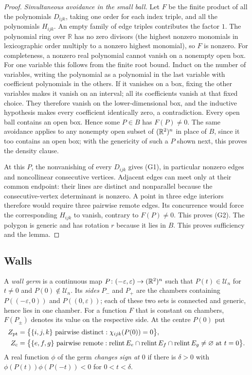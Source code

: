 \begin{proof}
\emph{Simultaneous avoidance in the small ball.}
Let $F$ be the finite product of all the polynomials $D_{ijk}$, taking
one order for each index triple, and all the polynomials $H_{ijk}$.
An empty family of edge triples contributes the factor $1$.
The polynomial ring over $\mathbb R$ has no zero divisors (the highest
nonzero monomials in lexicographic order multiply to a nonzero highest
monomial), so $F$ is nonzero.
For completeness, a nonzero real polynomial cannot vanish on a
nonempty open box. For one variable this follows from the finite root
bound. Induct on the number of variables, writing the polynomial as a
polynomial in the last variable with coefficient polynomials in the
others. If it vanishes on a box, fixing the other variables makes it
vanish on an interval; all its coefficients vanish at that fixed
choice. They therefore vanish on the lower-dimensional box, and the
inductive hypothesis makes every coefficient identically zero, a
contradiction. Every open ball contains an open box. Hence some
$P\in B$ has $F(P)\ne0$. The same avoidance applies to any nonempty open
subset of $(\mathbb R^2)^n$ in place of $B$, since it too contains an open box;
with the genericity of such a $P$ shown next, this proves the density clause.

At this $P$, the nonvanishing of every $D_{ijk}$ gives (G1), in
particular nonzero edges and noncollinear consecutive vertices.
Adjacent edges can meet only at their common endpoint: their lines
are distinct and nonparallel because the consecutive-vertex
determinant is nonzero. A point in three edge interiors therefore
would require three pairwise remote edges. Its concurrence would
force the corresponding $H_{ijk}$ to vanish, contrary to $F(P)\ne0$.
This proves (G2). The polygon is generic and has rotation $r$ because
it lies in $B$. This proves sufficiency and the lemma.
\end{proof}

\subsection{Walls}

\begin{definition}\label{def:germ}
A \emph{wall germ} is a continuous map $P\colon(-\varepsilon,\varepsilon)\to
(\mathbb R^2)^n$ such that $P(t)\in\mathcal U_n$ for $t\neq0$ and $P(0)\notin
\mathcal U_n$. Its \emph{sides} $P_-$ and $P_+$ are the chambers containing
$P((-\varepsilon,0))$ and $P((0,\varepsilon))$; each of these two sets is
connected and generic, hence lies in one chamber. For a function $F$ that is
constant on chambers, $F(P_\pm)$ denotes its value on the respective side.
At the centre $P(0)$ put
\begin{align*}
Z_{\rm pt}&=\bigl\{\{i,j,k\}\text{ pairwise distinct}:\chi_{ijk}(P(0))=0\bigr\},\\
Z_{\rm c}&=\bigl\{\{e,f,g\}\text{ pairwise remote}:
\operatorname{relint}E_e\cap\operatorname{relint}E_f\cap\operatorname{relint}E_g\neq\varnothing\text{ at }t=0\bigr\}.
\end{align*}
A real function $\phi$ of the germ \emph{changes sign at $0$} if there is
$\delta>0$ with $\phi(P(t))\phi(P(-t))<0$ for $0<t<\delta$.
\end{definition}

